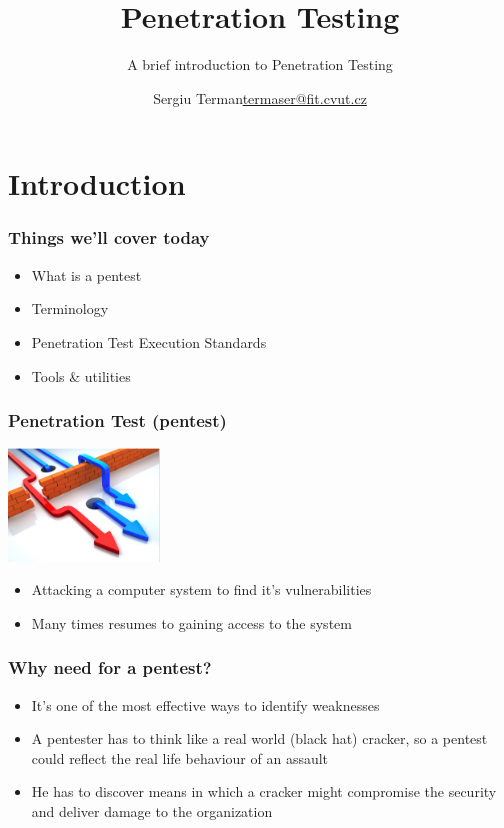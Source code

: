 \documentclass{beamer}
\title[Penetration Testing] %
{Penetration Testing}
\subtitle{A brief introduction to Penetration Testing}
\author{\texorpdfstring{Sergiu Terman\newline\url{termaser@fit.cvut.cz}}{Sergiu Terman}}
\institute[FIT CVUT] %
{CVUT}
\newcommand\ListFont{\fontsize{15}{30}\selectfont}
\begin{document}
\frame{\titlepage}

\section{Introduction}

\begin{frame}
	\frametitle{Things we'll cover today}
	\ListFont
	\begin{itemize}
		\item<2-> What is a pentest
		\item<3-> Terminology
		\item<4->Penetration Test Execution Standards
		\item<5> Tools \& utilities
	\end{itemize}
\end{frame}

\begin{frame}
	\frametitle{Penetration Test (pentest)}
	\begin{overprint}
		\begin{center}
		\includegraphics[height=3cm]{./pentest.png}
		\end{center}
	\end{overprint}

	\fontsize{15}{10}\selectfont
	\begin{alertblock}{}
		\begin{itemize} \itemsep4ex
		\item Attacking a computer system to find it’s vulnerabilities
		\item Many times resumes to gaining access to the system
		\end{itemize}
	\end{alertblock}
\end{frame}

\begin{frame}
	\frametitle{Why need for a pentest?}
	\fontsize{12}{15}\selectfont
	\begin{itemize} \itemsep4ex
	\item<2-> It’s one of the most effective ways to identify weaknesses
	\item<3-> A pentester has to think like a real world (black hat) cracker, so a pentest could reflect the \alert<4->{real life behaviour of an assault}
	\item<5> He has to discover means in which a cracker might compromise the security and deliver damage to the organization
	\end{itemize}
\end{frame}
\end{document}
